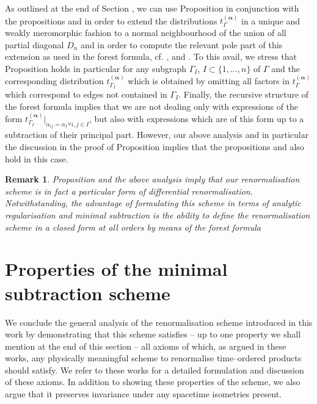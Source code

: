 \documentclass[10pt]{book}
\theoremstyle{break}
\newtheorem{remark}{Remark}
\begin{document}
As outlined at the end of Section %
, we can use Proposition %
in conjunction with the propositions %
and %
in order to extend the distributions $t_\Gamma^{(\boldsymbol{\alpha})}$ in a unique and weakly meromorphic fashion to a normal neighbourhood of the union of all partial diagonal $D_n$ and in order to compute the relevant pole part of this extension as used in the forest formula, cf. %
, %
and %
. To this avail, we stress that Proposition %
holds in particular for any subgraph $\Gamma_I$, $I\subset\{1,\dots,n\}$ of $\Gamma$ and the corresponding distribution $t_{\Gamma_I}^{(\boldsymbol{\alpha})}$ which is obtained by omitting all factors in $t_{\Gamma}^{(\boldsymbol{\alpha})}$ which correspond to edges not contained in $\Gamma_I$. Finally, the recursive structure of the forest formula %
implies that we are not dealing only with 
expressions of the form $t_{\Gamma_I}^{(\boldsymbol{\alpha})}|_{\alpha_{ij}=\alpha_I \forall i,j\in I}$, but also with expressions which are of this form up to a subtraction of their principal part. However, our above analysis and in particular the discussion in the proof of Proposition %
implies that the propositions %
and %
also hold in this case.

\begin{remark}
Proposition %
and the above analysis imply that our renormalisation scheme is in fact a particular form of differential renormalisation. Notwithstanding, the advantage of formulating this scheme in terms of analytic regularisation and minimal subtraction is the ability to define the renormalisation scheme in a closed form at all orders by means of the forest formula %
\end{remark}

\section{Properties of the minimal subtraction scheme}


We conclude the general analysis of the renormalisation scheme introduced in this work by demonstrating that this scheme satisfies -- up to one property we shall mention at the end of this section -- all axioms of%
which, as argued in these works, any physically meaningful scheme to renormalise time--ordered products should satisfy. We refer to these works for a detailed formulation and discussion of these axioms. In addition to showing these properties of the scheme, we also argue that it preserves invariance under any spacetime isometries present.
\end{document}
